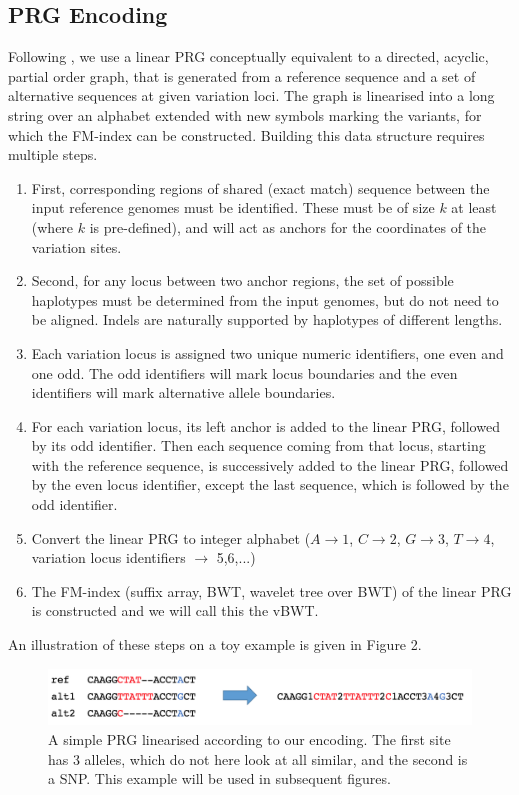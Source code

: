 \documentclass[runningheads,a4paper]{llncs}
\begin{document}
\subsection{PRG Encoding}

Following \cite{dilthey}, we use a linear PRG conceptually equivalent to a directed, acyclic, partial order graph, that is generated from a reference sequence and a set of alternative sequences at given variation loci. The graph is linearised into a long string over an alphabet extended with new symbols marking the variants, for which the FM-index can be constructed. Building this data structure requires multiple steps. 
\begin{enumerate}
\item First, corresponding regions of shared (exact match) sequence between the input reference genomes must be identified. These must be of size $k$ at least (where $k$ is pre-defined), and will act as anchors for the coordinates of the variation sites. 
\item Second, for any locus between two anchor regions, the set of possible haplotypes must be determined from the input genomes, but  do not need to be aligned. Indels are naturally supported by haplotypes of different lengths.
\item Each variation locus is assigned two unique numeric identifiers, one even and one odd. The odd identifiers will mark locus boundaries and the even identifiers will mark alternative allele boundaries.
\item For each variation locus, its left anchor is added to the linear PRG, followed by its odd identifier. Then each sequence coming from that locus, starting with the reference sequence, is successively added to the linear PRG, followed by the even locus identifier, except the last sequence, which is followed by the odd identifier.
\item Convert the linear PRG to integer alphabet ($A\rightarrow 1$, $C\rightarrow2$, $G\rightarrow3$, $T\rightarrow4$, variation locus identifiers $\rightarrow$ 5,6,...)
\item The FM-index (suffix array, BWT, wavelet tree over BWT) of the linear PRG is constructed and we will call this the vBWT.
\end{enumerate}

An illustration of these steps on a toy example is given in Figure 2.

\begin{figure}
\centering
\includegraphics[height=1.5cm]{linPRG}
\caption{A simple PRG linearised according to our encoding. The first site has 3 alleles, which do not here look at all similar, and the second is a SNP. This example will be used in subsequent figures.}
\label{lab}
\end{figure}
\end{document}
